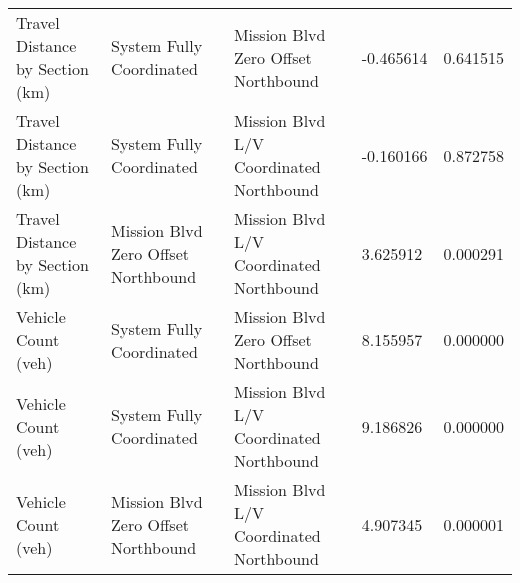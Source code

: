 \begin{tabular}{lllll}
Travel Distance by Section (km) & System Fully Coordinated & Mission Blvd Zero Offset Northbound & -0.465614 & 0.641515 \\
Travel Distance by Section (km) & System Fully Coordinated & Mission Blvd L/V Coordinated Northbound & -0.160166 & 0.872758 \\
Travel Distance by Section (km) & Mission Blvd Zero Offset Northbound & Mission Blvd L/V Coordinated Northbound & 3.625912 & 0.000291 \\
Vehicle Count (veh) & System Fully Coordinated & Mission Blvd Zero Offset Northbound & 8.155957 & 0.000000 \\
Vehicle Count (veh) & System Fully Coordinated & Mission Blvd L/V Coordinated Northbound & 9.186826 & 0.000000 \\
Vehicle Count (veh) & Mission Blvd Zero Offset Northbound & Mission Blvd L/V Coordinated Northbound & 4.907345 & 0.000001 \\
\bottomrule
\end{tabular}
